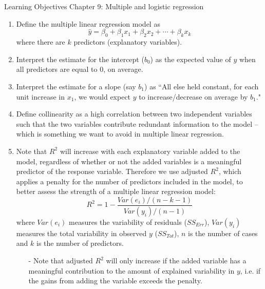 \documentclass[11pt]{article}
\begin{document}
{\LARGE \textcolor{oiB}{Learning Objectives \hfill Chapter 9: Multiple and logistic regression}} \\

%
\begin{enumerate}
\renewcommand\labelenumi{\textcolor{light}{\textbf{LO \theenumi.}}}

\item Define the multiple linear regression model as
\[ \hat{y} = \beta_0 + \beta_1 x_1 + \beta_2 x_2 + \cdots + \beta_k x_k \]
where there are $k$ predictors (explanatory variables).

\item Interpret the estimate for the intercept ($b_0$) as the expected value of $y$ when all predictors are equal to 0, on average.

\item Interpret the estimate for a slope (say $b_1$) as ``All else held constant, for each unit increase in $x_1$, we would expect $y$ to increase/decrease on average by $b_1$."

\item Define collinearity as a high correlation between two independent variables such that the two variables contribute redundant information to the model -- which is something we want to avoid in multiple linear regression.

\item Note that $R^2$ will increase with each explanatory variable added to the model, regardless of whether or not the added variables is a meaningful predictor of the response variable. Therefore we use adjusted $R^2$, which applies a penalty for the number of predictors included in the model, to better assess the strength of a multiple linear regression model:
\[ R^2 = 1 - \frac{Var(e_i) / (n - k - 1)}{Var(y_i) / (n - 1)} \]
where $Var(e_i)$ measures the variability of residuals ($SS_{Err}$), $Var(y_i)$ measures the total variability in observed $y$ ($SS_{Tot}$), $n$ is the number of cases and $k$ is the number of predictors.
\begin{itemize}
\item[-] Note that adjusted $R^2$ will only increase if the added variable has a meaningful contribution to the amount of explained variability in $y$, i.e. if the gains from adding the variable exceeds the penalty.
\end{itemize}

\end{enumerate}
\end{document}
